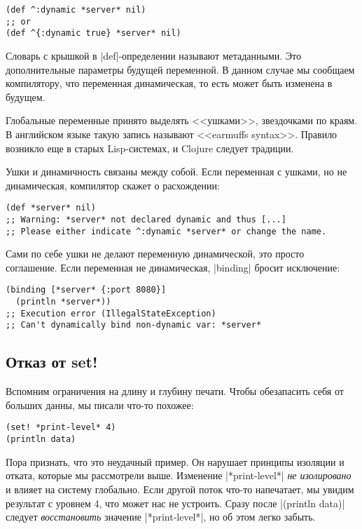 \begin{verbatim}
(def ^:dynamic *server* nil)
;; or
(def ^{:dynamic true} *server* nil)
\end{verbatim}

Словарь с крышкой в \spverb|def|-определении называют метаданными. Это
дополнительные параметры будущей переменной. В данном случае мы сообщаем
компилятору, что переменная динамическая, то есть может быть изменена в будущем.

Глобальные переменные принято выделять <<ушками>>, звездочками по краям. В
английском языке такую запись называют <<earmuffs syntax>>. Правило возникло еще
в старых Lisp-системах, и Clojure следует традиции.

Ушки и динамичность связаны между собой. Если переменная с ушками, но не
динамическая, компилятор скажет о расхождении:

\begin{verbatim}
(def *server* nil)
;; Warning: *server* not declared dynamic and thus [...]
;; Please either indicate ^:dynamic *server* or change the name.
\end{verbatim}

Сами по себе ушки не делают переменную динамической, это просто соглашение. Если
переменная не динамическая, \spverb|binding| бросит исключение:

\begin{verbatim}
(binding [*server* {:port 8080}]
  (println *server*))
;; Execution error (IllegalStateException)
;; Can't dynamically bind non-dynamic var: *server*
\end{verbatim}

\subsection{Отказ от set!}

Вспомним ограничения на длину и глубину печати. Чтобы обезапасить себя от
больших данны, мы писали что-то похожее:

\begin{verbatim}
(set! *print-level* 4)
(println data)
\end{verbatim}

Пора признать, что это неудачный пример. Он нарушает принципы изоляции и отката,
которые мы рассмотрели выше. Изменение \spverb|*print-level*| \emph{не
  изолировано} и влияет на систему глобально. Если другой поток что-то
напечатает, мы увидим результат с уровнем 4, что может нас не устроить. Сразу
после \spverb|(println data)| следует \emph{восстановить} значение
\spverb|*print-level*|, но об этом легко забыть.

